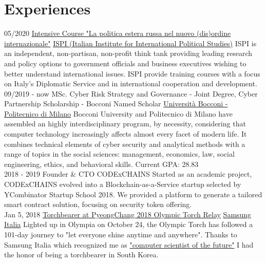 \documentclass[]{friggeri-cv}
\begin{document}
\section{Experiences}
\begin{entrylist}
    \entry
    {05/2020}
    {\href{https://www.ispionline.it/it/ispi-school/course/calendar/la-politica-estera-russa-nel-nuovo-disordine-internazionale-distance-learning-24512}{Intensive Course "La politica estera russa nel nuovo (dis)ordine internazionale"}}
    { \href{https://www.ispionline.it/en}{ISPI (Italian Institute for International Political Studies)}}
    {ISPI is an independent, non-partisan, non-profit think tank providing leading research and policy options to government officials and business executives wishing to better understand international issues. ISPI provide training courses with a focus on Italy’s Diplomatic Service and in international cooperation and development.}
    \entry
    {09/2019 - now}
    {MSc. Cyber Risk Strategy and Governance - Joint Degree, Cyber Partnership Scholarship - Bocconi Named Scholar}
    { \href{https://www.unibocconi.eu/wps/wcm/connect/bocconi/sitopubblico_en/navigation+tree/home/programs/master+of+science/cyber+risk+strategy+and+governance}{Università Bocconi - Politecnico di Milano}}
    {Bocconi University and Politecnico di Milano have assembled an highly interdisciplinary program, by necessity, considering that computer technology increasingly affects almost every facet of modern life. It combines technical elements of cyber security and analytical methods with a range of topics in the social sciences: management, economics, law, social engineering, ethics, and behavioral skills. Current GPA: 28.83 \\}
    \entry
    {2018 - 2019}
    {Founder \& CTO}
    {CODExCHAINS}
    {Started as an academic project, CODExCHAINS evolved into a Blockchain-as-a-Service startup selected by YCombinator Startup School 2018. We provided a platform to generate a tailored smart contract solution, focusing on security token offering. \\}
    \entry
    {Jan 5, 2018}
    {\href{https://www.pyeongchang2018.com/en/torch-relay/index}{Torchbearer at PyeongChang 2018 Olympic Torch Relay}}
    { \href{http://www.samsung.com/it/}{Samsung Italia}}
    {Lighted up in Olympia on October 24, the Olympic Torch has followed a 101-day journey to "let everyone shine anytime and anywhere". Thanks to Samsung Italia which recognized me as \href{http://www.samsung.com/it/diventatedoforo/}{"computer scientist of the future"} I had the honor of being a torchbearer in South Korea.\\}

\end{entrylist}
\end{document}
